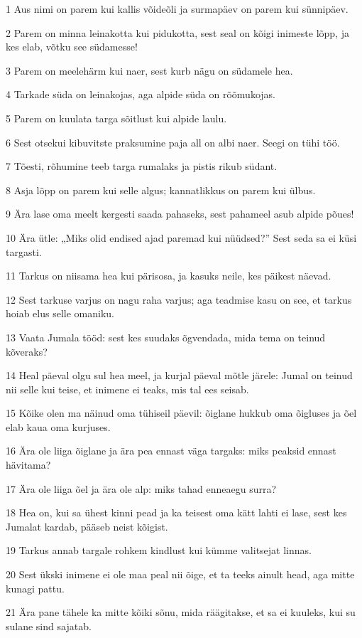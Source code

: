 \par 1 Aus nimi on parem kui kallis võideõli ja surmapäev on parem kui sünnipäev.
\par 2 Parem on minna leinakotta kui pidukotta, sest seal on kõigi inimeste lõpp, ja kes elab, võtku see südamesse!
\par 3 Parem on meelehärm kui naer, sest kurb nägu on südamele hea.
\par 4 Tarkade süda on leinakojas, aga alpide süda on rõõmukojas.
\par 5 Parem on kuulata targa sõitlust kui alpide laulu.
\par 6 Sest otsekui kibuvitste praksumine paja all on albi naer. Seegi on tühi töö.
\par 7 Tõesti, rõhumine teeb targa rumalaks ja pistis rikub südant.
\par 8 Asja lõpp on parem kui selle algus; kannatlikkus on parem kui ülbus.
\par 9 Ära lase oma meelt kergesti saada pahaseks, sest pahameel asub alpide põues!
\par 10 Ära ütle: „Miks olid endised ajad paremad kui nüüdsed?” Sest seda sa ei küsi targasti.
\par 11 Tarkus on niisama hea kui pärisosa, ja kasuks neile, kes päikest näevad.
\par 12 Sest tarkuse varjus on nagu raha varjus; aga teadmise kasu on see, et tarkus hoiab elus selle omaniku.
\par 13 Vaata Jumala tööd: sest kes suudaks õgvendada, mida tema on teinud kõveraks?
\par 14 Heal päeval olgu sul hea meel, ja kurjal päeval mõtle järele: Jumal on teinud nii selle kui teise, et inimene ei teaks, mis tal ees seisab.
\par 15 Kõike olen ma näinud oma tühiseil päevil: õiglane hukkub oma õigluses ja õel elab kaua oma kurjuses.
\par 16 Ära ole liiga õiglane ja ära pea ennast väga targaks: miks peaksid ennast hävitama?
\par 17 Ära ole liiga õel ja ära ole alp: miks tahad enneaegu surra?
\par 18 Hea on, kui sa ühest kinni pead ja ka teisest oma kätt lahti ei lase, sest kes Jumalat kardab, pääseb neist kõigist.
\par 19 Tarkus annab targale rohkem kindlust kui kümme valitsejat linnas.
\par 20 Sest ükski inimene ei ole maa peal nii õige, et ta teeks ainult head, aga mitte kunagi pattu.
\par 21 Ära pane tähele ka mitte kõiki sõnu, mida räägitakse, et sa ei kuuleks, kui su sulane sind sajatab.
